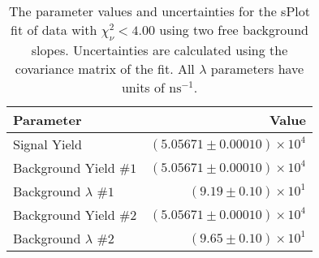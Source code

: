 
\begin{table}[h]
    \begin{center}
        \begin{tabular}{lr}\toprule
            Parameter & Value \\\midrule
            Signal Yield & $(5.05671 \pm 0.00010) \times 10^{4}$ \\
            Background Yield $\#1$ & $(5.05671 \pm 0.00010) \times 10^{4}$ \\
            Background $\lambda$ $\#1$ & $(9.19 \pm 0.10) \times 10^{1}$ \\
            Background Yield $\#2$ & $(5.05671 \pm 0.00010) \times 10^{4}$ \\
            Background $\lambda$ $\#2$ & $(9.65 \pm 0.10) \times 10^{1}$ \\\bottomrule
        \end{tabular}
        \caption{The parameter values and uncertainties for the sPlot fit of data with $\chi^2_\nu < 4.00$ using two free background slopes. Uncertainties are calculated using the covariance matrix of the fit. All $\lambda$ parameters have units of $\si{\nano\second}^{-1}$.}
    \end{center}
\end{table}

